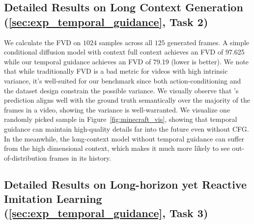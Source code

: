 \subsection{Detailed Results on Long Context Generation (\cref{sec:exp_temporal_guidance}, \textbf{Task 2})}
\label{app:exp_results_minecraft}
We calculate the FVD on $1024$ samples across all $125$ generated frames. A simple conditional diffusion model with context full context achieves an FVD of 97.625 while our temporal guidance achieves an FVD of 79.19 (lower is better). We note that while traditionally FVD is a bad metric for videos with high intrinsic variance, it's well-suited for our benchmark since both action-conditioning and the dataset design constrain the possible variance. We visually observe that \method's prediction aligns well with the ground truth semantically over the majority of the frames in a video, showing the variance is well-warranted. We visualize one randomly picked sample in Figure~\ref{fig:minecraft_vis}, showing that temporal guidance can maintain high-quality details far into the future even without CFG. In the meanwhile, the long-context model without temporal guidance can suffer from the high dimensional context, which makes it much more likely to see out-of-distribution frames in its history.

\subsection{Detailed Results on Long-horizon yet Reactive Imitation Learning (\cref{sec:exp_temporal_guidance}, \textbf{Task 3})}
\label{app:exp_results_robot}


